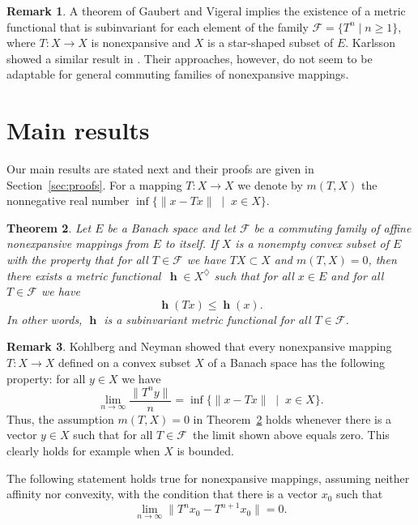 \documentclass[a4paper,12pt]{article}
\newtheorem{theorem}{Theorem}[section]
\theoremstyle{definition}
\newtheorem{remark}[theorem]{Remark}
\numberwithin{equation}{section}
\newcommand{\norm}[1]{\lVert#1\rVert} %
\newcommand{\F}{\mathcal{F}} %
\numberwithin{equation}{section}
\DeclareMathOperator{\h}{\mathbf{h}} %
\begin{document}
\begin{remark}
A theorem of Gaubert and Vigeral  
\cite{Gaubert-Vigeral-2012} implies the 
existence of a metric functional that is 
subinvariant for each element of the family 
$\F = \{ T^n \mid n\geq 1\}$, where $T:X\to X$ 
is nonexpansive and $X$ is a star-shaped 
subset of $E$. Karlsson showed a similar 
result in \cite[Proposition~13]{Karlsson2023}. 
Their approaches, however, do not seem to be 
adaptable for general commuting 
families of nonexpansive mappings. 
\end{remark}


\section{Main results}

Our main results are stated next and their 
proofs are given in Section~\ref{sec:proofs}.
For a mapping $T:X\to X$ we denote by $m(T,X)$
the nonnegative real number 
$\inf\{\norm{x-Tx}\;\mid\;x\in X\}$.

\begin{theorem}\label{thm:1}
Let $E$ be a Banach space and let $\F$ be a 
commuting family of affine nonexpansive 
mappings from $E$ to itself. If $X$ is a
nonempty convex subset of $E$ with the 
property that for all $T\in\F$ we have 
$TX \subset X$ and $m(T,X) = 0$, then
there exists a metric functional 
$\,\h\in X^\diamondsuit$ such that for all 
$x\in E$ and for all $T\in\F$ we have
$$
    \h(Tx) \leq \h(x).      
$$
In other words, $\h$ is a subinvariant metric
functional for all $T\in\F$.
\end{theorem}

\begin{remark}\label{rem:1}
Kohlberg and Neyman \cite{Kohlberg_Neyman1981} 
showed that every nonexpansive mapping 
$T:X \to X$ defined on a convex subset $X$ of 
a Banach space has the following property: 
for all $y \in X$ we have 
$$
\lim_{n\to\infty}\frac{\norm{T^{n}y}}{n}
    = \inf\{\norm{x-Tx}\;\mid\;x\in X\}.
$$
Thus, the assumption $m(T,X) = 0$ in 
Theorem~\ref{thm:1} holds whenever there is a 
vector $y\in X$ such that for all $T\in\F\,$ 
the limit shown above equals zero. This 
clearly holds for example when $X$ is bounded.  
\end{remark}

The following statement holds true for 
nonexpansive mappings, assuming neither 
affinity nor convexity, with the condition
that there is a vector $x_0$ such that 
\begin{equation}\label{melkeintarkei}
    \lim_{n\to\infty} 
    \norm{T^n x_0 - T^{n+1} x_0} = 0.
\end{equation}
\end{document}
